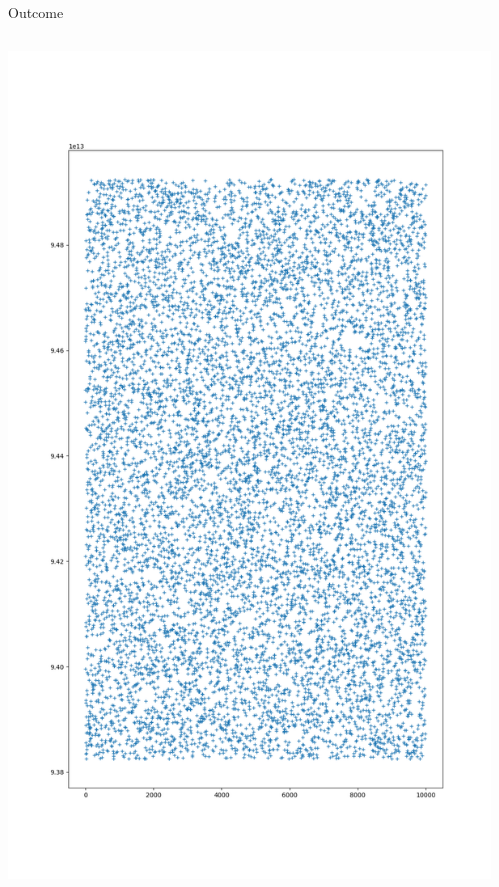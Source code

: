 \documentclass{beamer}
\begin{document}
\begin{frame}{Outcome}
    \begin{columns}
        \begin{column}{0.5\textwidth}
            \includegraphics[height=.9\textheight]{Figure_1.png}
        \end{column}
        \begin{column}{.5\textwidth}

\end{column}
\end{columns}
\end{frame}
\end{document}
